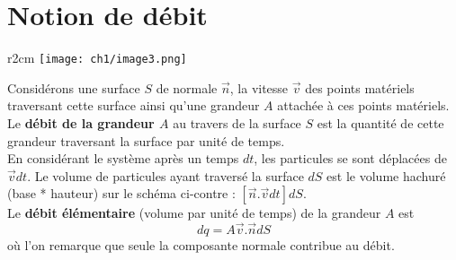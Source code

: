 \section{Notion de débit}
\begin{wrapfigure}[12]{r}{2cm}
	\texttt{[image: ch1/image3.png]}
\end{wrapfigure}
Considérons une surface $S$ de normale $\vec n$, la vitesse $\vec{v}$ des points matériels traversant cette
surface ainsi qu'une grandeur $A$ attachée à ces points matériels.\\
Le \textbf{débit de la grandeur $A$} au travers de la surface $S$ est la quantité de cette grandeur 
traversant la surface par unité de temps.\\

En considérant le système après un temps $dt$, les particules se sont déplacées de $\vec{v}dt$. Le
volume de particules ayant traversé la surface $dS$ est le volume hachuré (base * hauteur) sur le
schéma ci-contre : $[\vec{n}.\vec{v}dt]dS$.\\
Le \textbf{débit élémentaire} (volume par unité de temps) de la grandeur $A$ est 
\begin{equation}
	dq = A \vec{v}.\vec{n}dS
\end{equation}
où l'on remarque que seule la composante normale contribue au débit.
